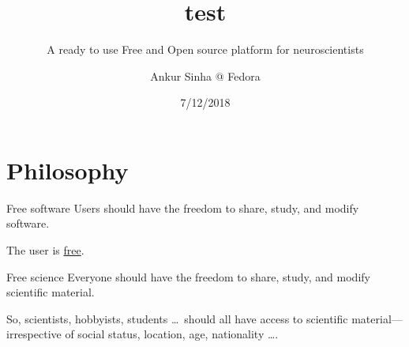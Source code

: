 
\usepackage{color}
\usepackage{tipa}
\usepackage[scale=2]{ccicons}
\usepackage{amssymb}
\usepackage{tikz}
\usetikzlibrary{arrows.meta, arrows}
\usepackage{jneurosci}
\usepackage{subfig}
\usepackage[T1]{fontenc}
\usepackage[utf8]{inputenc}
\usepackage[style=verbose,backend=biber,autocite=footnote]{biblatex}

\usepackage[default,osfigures,scale=0.95]{opensans}
\usepackage[normalem]{ulem}
\usepackage{hyperref}
\hypersetup{colorlinks,linkcolor=Green,urlcolor=links}
\usepackage{graphicx}
\usepackage{algorithmic}
\usepackage{textcomp}
\usepackage{wrapfig}
\usepackage{textgreek}
\usepackage{euler}



\title[test]{test}
\subtitle{A ready to use Free and Open source platform for neuroscientists}
\author[Ankur Sinha]{Ankur Sinha @ Fedora}
\date[7/12/2018]{7/12/2018}



\begin{frame}
  \titlepage{}
\end{frame}

\section{Philosophy}
\begin{frame}[c]{Free software}
  Users should have the freedom to \alert{share, study, and modify} software\footnotemark.
  \pause{}

  The \alert{user} is \href{https://www.fsf.org/about/what-is-free-software}{free}.

\end{frame}
\begin{frame}[c]{Free science}
  \alert{Everyone} should have the freedom to \alert{share, study, and modify} scientific material\footnotemark.
  \pause{}

  So, scientists, hobbyists, students \ldots\ should all have access to scientific material---irrespective of social status, location, age, nationality \ldots.
\end{frame}
